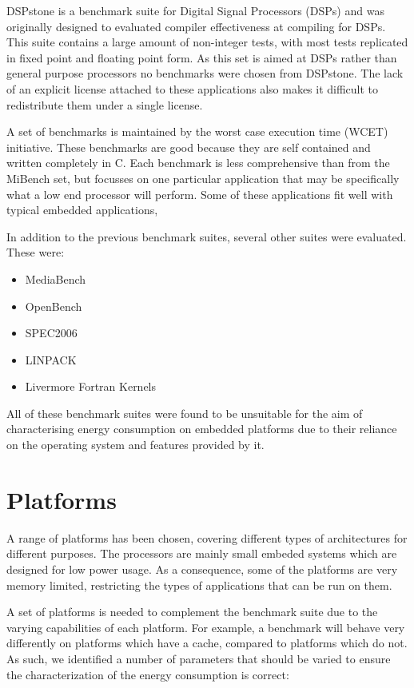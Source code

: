 \documentclass[twocolumn]{article}
\begin{document}
DSPstone\cite{Zivojnovic} is a benchmark suite for Digital Signal Processors (DSPs) and was originally designed to evaluated compiler effectiveness at compiling for DSPs. This suite contains a large amount of non-integer tests, with most tests replicated in fixed point and floating point form. As this set is aimed at DSPs rather than general purpose processors no benchmarks were chosen from DSPstone. The lack of an explicit license attached to these applications also makes it difficult to redistribute them under a single license.

A set of benchmarks is maintained by the worst case execution time (WCET) initiative\cite{Gustafsson2010}. These benchmarks are good because they are self contained and written completely in C. Each benchmark is less comprehensive than from the MiBench set, but focusses on one particular application that may be specifically what a low end processor will perform. Some of these applications fit well with typical embedded applications,

In addition to the previous benchmark suites, several other suites were evaluated. These were:
\begin{itemize}
	\setlength{\itemsep}{-0.25em}
	\item MediaBench
	\item OpenBench\cite{Rebe2012}
	\item SPEC2006\cite{Henning2006}
	\item LINPACK
	\item Livermore Fortran Kernels
\end{itemize}

All of these benchmark suites were found to be unsuitable for the aim of characterising energy consumption on embedded platforms due to their reliance on the operating system and features provided by it.

\section{Platforms}

A range of platforms has been chosen, covering different types of architectures for different purposes. The processors are mainly small embeded systems which are designed for low power usage. As a consequence, some of the platforms are very memory limited, restricting the types of applications that can be run on them.

A set of platforms is needed to complement the benchmark suite due to the varying capabilities of each platform. For example, a benchmark will behave very differently on platforms which have a cache, compared to platforms which do not. As such, we identified a number of parameters that should be varied to ensure the characterization of the energy consumption is correct:
\end{document}
